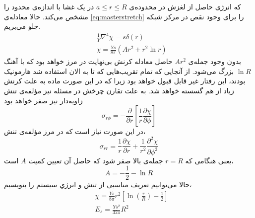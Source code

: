 که انرژی حاصل از لغزش در محدوده‌ی 
$a\leq r\leq R$
در یک غشا با اندازه‌ی محدود را مشخص می‌کند. حالا معادله‌ی 
\ref{eq:masterstretch}
را برای وجود نقص در  مرکز  شبکه جلو می‌بریم.
\begin{equation}
\begin{aligned}
&\frac{1}{Y}\nabla^4\chi=s\delta(r)\\
&\chi=\frac{Ys}{8\pi}(Ar^2+r^2\ln r)
\end{aligned}
\end{equation}
بدون وجود جمله‌ی $Ar^2$
حاصل معادله کرنش بی‌نهایت در مرز خواهد بود که با آهنگ $\ln R$ بزرگ می‌شود. از آنجایی که تمام تقریب‌هایی که تا به الان استفاده شد هارمونیک بودند، این رفتار غیر قابل قبول خواهد بود زیرا که در این صورت ماده به علت کرنش زیاد از هم گسسته خواهد شد. به علت تقارن چرخش در مسئله نیز مؤلفه‌ی تنش زاویه‌دار نیز صفر  خواهد بود
\begin{equation}
\sigma_{r\phi}=-\frac{\partial}{\partial r}\left[\frac{1}{r}\frac{\partial\chi}{\partial\phi}\right]
\end{equation}
در این صورت نیاز است که در مرز مؤلفه‌ی تنش،
\begin{equation}
\sigma_{rr}=\frac{1}{r}\frac{\partial\chi}{\partial r}+\frac{1}{r^2}\frac{\partial^2\chi}{\partial \phi^2}
\end{equation}
یعنی هنگامی که $r=R$ جمله‌ی بالا صفر شود که حاصل آن تعیین کمیت $A$
است،
\begin{equation}
A=-\frac{1}{2}-\ln R
\end{equation}
حالا می‌توانیم تعریف مناسبی از تنش و انرژي سیستم را بنویسیم،
\begin{equation}
\begin{aligned}
&\chi=\frac{Ys}{8\pi}r^2\left[\ln \left(\frac{r}{R}\right)-\frac{1}{2}\right]\\
&E_s=\frac{Ys^2}{32\pi}R^2
\end{aligned}
\end{equation}



















